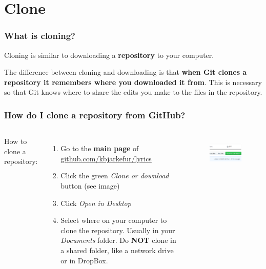 \documentclass[aspectratio=169]{beamer} %
\newcommand{\trainingURL}[1]{{\color{blue}\url{#1}}}
\newcommand{\traininerUsername}{kbjarkefur}
\newcommand{\repoName}{\traininerUsername/lyrics}
\newcommand{\trainingRepoURL}[1]{\trainingURL{github.com/\repoName #1}}
\begin{document}
\section{Clone}

\begin{frame}
\frametitle{What is cloning?}
	
	Cloning is similar to downloading a \textbf{repository} to your computer.
	
	\vspace{.5cm}
	
	The difference between cloning and downloading is that \textbf{when Git clones a repository it remembers where you downloaded it from}. This is necessary so that Git knows where to share the edits you make to the files in the repository.
	
\end{frame}

\begin{frame}
\frametitle{How do I clone a repository from GitHub?}
	
	\begin{columns}[c] 
		
		How to clone a repository:
		\begin{enumerate}
			\item Go to the \textbf{main page} of \trainingRepoURL{}
			\item Click the green \textit{Clone or download} button (see image)
			\item Click \textit{Open in Desktop}
			\item Select where on your computer to clone the repository. Usually in your \textit{Documents} folder. Do \textbf{NOT} clone in a shared folder, like a network drive or in DropBox. 
		\end{enumerate}
		
		\begin{figure}
			\centering
			\includegraphics[width=1\linewidth]{img/clonedownload_button}
			\label{fig:clonedownloadbutton}
		\end{figure}
	
	\end{columns}

\end{frame}
\end{document}
